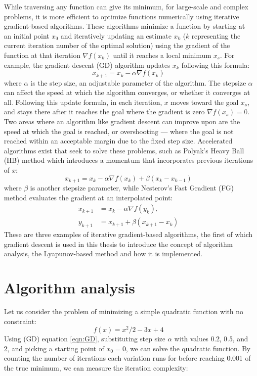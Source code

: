 While traversing any function can give its minimum, for large-scale and complex problems, it is more efficient to optimize functions numerically using iterative gradient-based algorithms. These algorithms minimize a function by starting at an initial point \(x_{0}\) and iteratively updating an estimate \(x_k\) (\(k\) representing the current iteration number of the optimal solution) using the gradient of the function at that iteration $\nabla f(x_k)$ until it reaches a local minimum \(x_s\). For example, the gradient descent (GD) algorithm updates \(x_k\) following this formula:
\begin{equation}\label{eqn:GD}
  x_{k+1}=x_{k}-\alpha \nabla f(x_k)
\end{equation}
where $\alpha$ is the step size, an adjustable parameter of the algorithm. The stepsize $\alpha$ can affect the speed at which the algorithm converges, or whether it converges at all. Following this update formula, in each iteration, \(x\) moves toward the goal \(x_s\), and stays there after it reaches the goal where the gradient is zero $\nabla f(x_s) = 0$. Two areas where an algorithm like gradient descent can improve upon are the speed at which the goal is reached, or overshooting --- where the goal is not reached within an acceptable margin due to the fixed step size. Accelerated algorithms exist that seek to solve these problems, such as Polyak’s Heavy Ball (HB) method which introduces a momentum that incorporates previous iterations of \(x\):
\begin{equation}\label{eqn:HB}
  x_{k+1}=x_k-\alpha \nabla f(x_k)+ \beta (x_k-x_{k-1})
\end{equation}
where $\beta$ is another stepsize parameter, while Nesterov’s Fast Gradient (FG) method evaluates the gradient at an interpolated point:
\begin{subequations} \label{eqn:FG}
  \begin{align}
    x_{k+1}     &=x_k-\alpha \nabla f(y_k), \label{eq_state}       \\
    y_{k+1} &=x_{k+1}+\beta (x_{k+1}-x_k) \label{eq_interpolated point}
  \end{align}
  \end{subequations}
These are three examples of iterative gradient-based algorithms, the first of which gradient descent is used in this thesis to introduce the concept of algorithm analysis, the Lyapunov-based method and how it is implemented.
\section{Algorithm analysis}
Let us consider the problem of minimizing a simple quadratic function with no constraint:
\begin{equation} \label{eqn:quadratic}
    f(x) = x^2/2 - 3x + 4
\end{equation}
Using (GD) equation \eqref{eqn:GD}, substituting step size $\alpha$ with values 0.2, 0.5, and 2, and picking a starting point of $x_0 = 0$, we can solve the quadratic function. By counting the number of iterations each variation runs for before reaching 0.001 of the true minimum, we can measure the iteration complexity: 

